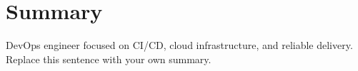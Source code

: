 \section{Summary}
DevOps engineer focused on CI/CD, cloud infrastructure, and reliable delivery.
Replace this sentence with your own summary.
